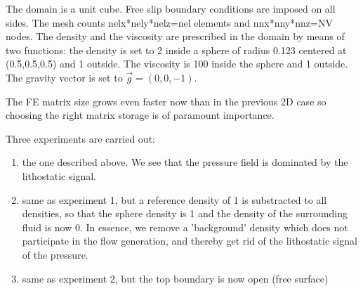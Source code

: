 

The domain is a unit cube. Free slip boundary conditions 
are imposed on all sides. The mesh counts 
nelx*nely*nelz=nel elements and 
nnx*nny*nnz=NV nodes.
The density and the viscosity are prescribed in the domain 
by means of two functions:
the density is set to 2 inside a sphere of radius 0.123 centered 
at (0.5,0.5,0.5) and 1 outside. The viscosity is 100 inside the sphere
and 1 outside.  The gravity vector is set to $\vec{g}=(0,0,-1)$.

The FE matrix size grows even faster now than in the previous 2D case so
choosing the right matrix storage is of paramount importance. 

Three experiments are carried out:
\begin{enumerate}
\item the one described above.
We see that the pressure field is dominated by the lithostatic signal.
\item same as experiment 1, but a reference density of 1 is substracted to all densities, so that 
the sphere density is 1 and the density of the surrounding fluid is now 0. In essence, we remove a
'background' density which does not participate in the flow generation, and thereby get rid of the 
lithostatic signal of the pressure.
\item same as experiment 2, but the top boundary is now open (free surface)
\end{enumerate} 


